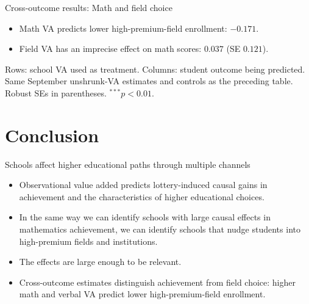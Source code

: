 \documentclass[11pt,aspectratio=169]{beamer}
\newenvironment{wideitemize}{%
  \begin{minipage}{0.92\textwidth}
  \begin{itemize}
  \addtolength{\itemsep}{0.75em}
}{%
  \end{itemize}
  \end{minipage}
}
\begin{document}
\begin{frame}{Cross-outcome results: Math and field choice}
\centering
\small
\setlength{\tabcolsep}{12pt}
\renewcommand{\arraystretch}{1.25}


\vspace{0.8em}
\begin{wideitemize}
  \item Math VA predicts lower high-premium-field enrollment: $-0.171$.
  \item Field VA has an imprecise effect on math scores: $0.037$ (SE $0.121$).
\end{wideitemize}

\vspace{0.4em}
\scriptsize
Rows: school VA used as treatment. Columns: student outcome being predicted.
Same September unshrunk-VA estimates and controls as the preceding table.
Robust SEs in parentheses. $^{***}p<0.01$.
\end{frame}

\section{Conclusion}

\begin{frame}{Schools affect higher educational paths through multiple channels}
\begin{wideitemize}
  \item Observational value added predicts lottery-induced causal gains in achievement and the characteristics of higher educational choices.

  \item In the same way we can identify schools with large causal effects in mathematics achievement, we can identify schools that nudge students into high-premium fields and institutions.

  \item The effects are large enough to be relevant.

  \item Cross-outcome estimates distinguish achievement from field choice: higher math and verbal VA predict lower high-premium-field enrollment.
\end{wideitemize}

\end{frame}
\end{document}
